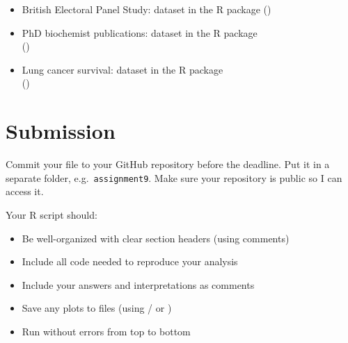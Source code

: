 \begin{itemize}
  \item British Electoral Panel Study:  dataset in the  R package ()
  \item PhD biochemist publications:  dataset in the  R package\\ ()
  \item Lung cancer survival:  dataset in the  R package\\ ()
\end{itemize}

\vspace{15pt}

\section{Submission}

Commit your file to your GitHub repository before the deadline. Put it in a separate folder, e.g.\ \texttt{assignment9}. Make sure your repository is public so I can access it.

Your R script should:
\begin{itemize}
  \item Be well-organized with clear section headers (using comments)
  \item Include all code needed to reproduce your analysis
  \item Include your answers and interpretations as comments
  \item Save any plots to files (using / or )
  \item Run without errors from top to bottom
\end{itemize}



